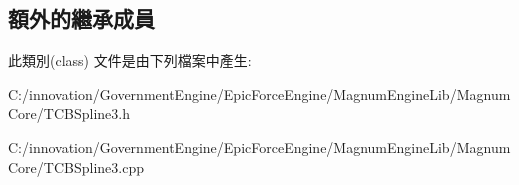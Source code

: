 \subsection*{額外的繼承成員}


此類別(class) 文件是由下列檔案中產生\+:\begin{DoxyCompactItemize}
\item 
C\+:/innovation/\+Government\+Engine/\+Epic\+Force\+Engine/\+Magnum\+Engine\+Lib/\+Magnum\+Core/T\+C\+B\+Spline3.\+h\item 
C\+:/innovation/\+Government\+Engine/\+Epic\+Force\+Engine/\+Magnum\+Engine\+Lib/\+Magnum\+Core/T\+C\+B\+Spline3.\+cpp\end{DoxyCompactItemize}
